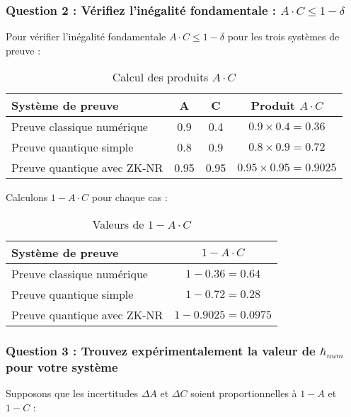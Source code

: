 \documentclass[12pt, a4paper]{article}
\begin{document}
		\subsubsection*{Question 2 : Vérifiez l'inégalité fondamentale : $A \cdot C \leq 1 - \delta$}
		
		Pour vérifier l'inégalité fondamentale $A \cdot C \leq 1 - \delta$ pour les trois systèmes de preuve :
		
		\begin{table}[H]
			\centering
			\begin{tabular}{|p{5cm}|c|c|c|}
				\hline
				\textbf{Système de preuve} & \textbf{A} & \textbf{C} & \textbf{Produit $A \cdot C$} \\
				\hline
				Preuve classique numérique & 0.9 & 0.4 & $0.9 \times 0.4 = 0.36$ \\
				\hline
				Preuve quantique simple & 0.8 & 0.9 & $0.8 \times 0.9 = 0.72$ \\
				\hline
				Preuve quantique avec ZK-NR & 0.95 & 0.95 & $0.95 \times 0.95 = 0.9025$ \\
				\hline
			\end{tabular}
			\caption{Calcul des produits $A \cdot C$}
		\end{table}
		
		Calculons $1 - A \cdot C$ pour chaque cas :
		
		\begin{table}[H]
			\centering
			\begin{tabular}{|p{5cm}|c|}
				\hline
				\textbf{Système de preuve} & \textbf{$1 - A \cdot C$} \\
				\hline
				Preuve classique numérique & $1 - 0.36 = 0.64$ \\
				\hline
				Preuve quantique simple & $1 - 0.72 = 0.28$ \\
				\hline
				Preuve quantique avec ZK-NR & $1 - 0.9025 = 0.0975$ \\
				\hline
			\end{tabular}
			\caption{Valeurs de $1 - A \cdot C$}
		\end{table}
		
		\subsubsection*{Question 3 : Trouvez expérimentalement la valeur de $\hbar_{num}$ pour votre système}
		
		Supposons que les incertitudes $\Delta A$ et $\Delta C$ soient proportionnelles à $1 - A$ et $1 - C$ :
		
\end{document}
